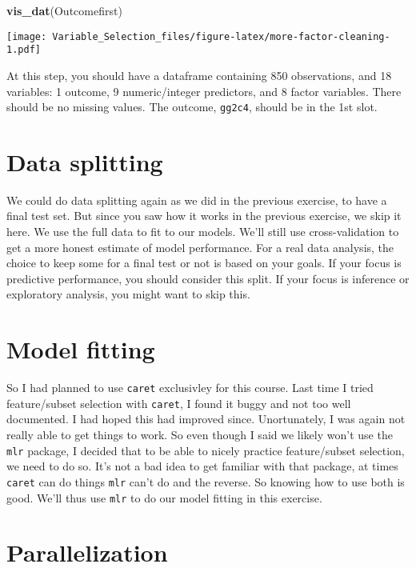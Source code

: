 \documentclass[]{article}
\newenvironment{Shaded}{\begin{snugshade}}{\end{snugshade}}
\newcommand{\KeywordTok}[1]{\textcolor[rgb]{0.13,0.29,0.53}{\textbf{#1}}}
\newcommand{\NormalTok}[1]{#1}
\begin{document}
\begin{Shaded}
\begin{Highlighting}[]
\KeywordTok{vis_dat}\NormalTok{(Outcomefirst)}
\end{Highlighting}
\end{Shaded}

\texttt{[image: Variable\_Selection\_files/figure-latex/more-factor-cleaning-1.pdf]}

At this step, you should have a dataframe containing 850 observations,
and 18 variables: 1 outcome, 9 numeric/integer predictors, and 8 factor
variables. There should be no missing values. The outcome,
\texttt{gg2c4}, should be in the 1st slot.

\hypertarget{data-splitting}{%
\section{Data splitting}\label{data-splitting}}

We could do data splitting again as we did in the previous exercise, to
have a final test set. But since you saw how it works in the previous
exercise, we skip it here. We use the full data to fit to our models.
We'll still use cross-validation to get a more honest estimate of model
performance. For a real data analysis, the choice to keep some for a
final test or not is based on your goals. If your focus is predictive
performance, you should consider this split. If your focus is inference
or exploratory analysis, you might want to skip this.

\hypertarget{model-fitting}{%
\section{Model fitting}\label{model-fitting}}

So I had planned to use \texttt{caret} exclusivley for this course. Last
time I tried feature/subset selection with \texttt{caret}, I found it
buggy and not too well documented. I had hoped this had improved since.
Unortunately, I was again not really able to get things to work. So even
though I said we likely won't use the \texttt{mlr} package, I decided
that to be able to nicely practice feature/subset selection, we need to
do so. It's not a bad idea to get familiar with that package, at times
\texttt{caret} can do things \texttt{mlr} can't do and the reverse. So
knowing how to use both is good. We'll thus use \texttt{mlr} to do our
model fitting in this exercise.

\hypertarget{parallelization}{%
\section{Parallelization}\label{parallelization}}
\end{document}
